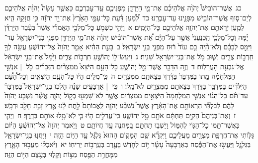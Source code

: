 \documentclass[18pt]{article}
\newcommand{\kri}[1]{\Afootnote{#1}}	%
\begin{document}
 {\loc כג~}אֲשֶׁר־הוֹבִישׁ֩ יְהֹוָ֨ה אֱלֹהֵיכֶ֜ם אֶת־מֵ֧י הַיַּרְדֵּ֛ן מִפְּנֵיכֶ֖ם עַֽד־עׇבְרְכֶ֑ם כַּאֲשֶׁ֣ר עָשָׂה֩ יְהֹוָ֨ה אֱלֹהֵיכֶ֧ם לְיַם־ס֛וּף אֲשֶׁר־הוֹבִ֥ישׁ מִפָּנֵ֖ינוּ עַד־עׇבְרֵֽנוּ׃ \startlock
 {\loc כד~}לְ֠מַ֠עַן דַּ֜עַת כׇּל־עַמֵּ֤י הָאָ֙רֶץ֙ אֶת־יַ֣ד יְהֹוָ֔ה כִּ֥י חֲזָקָ֖ה הִ֑יא לְמַ֧עַן יְרָאתֶ֛ם אֶת־יְהֹוָ֥ה אֱלֹהֵיכֶ֖ם כׇּל־הַיָּמִֽים׃ 
\startlock
 {\loc א~}וַיְהִ֣י כִשְׁמֹ֣עַ כׇּל־מַלְכֵ֣י הָאֱמֹרִ֡י אֲשֶׁר֩ בְּעֵ֨בֶר הַיַּרְדֵּ֜ן יָ֗מָּה וְכׇל־מַלְכֵ֤י הַֽכְּנַעֲנִי֙ אֲשֶׁ֣ר עַל־הַיָּ֔ם אֵ֠ת אֲשֶׁר־הוֹבִ֨ישׁ יְהֹוָ֜ה אֶת־מֵ֧י הַיַּרְדֵּ֛ן מִפְּנֵ֥י בְנֵי־יִשְׂרָאֵ֖ל עַד־ \edtext{(עברנו)}{\kri{קרי: עׇבְרָ֑ם}}  וַיִּמַּ֣ס לְבָבָ֗ם וְלֹא־הָ֨יָה בָ֥ם עוֹד֙ ר֔וּחַ מִפְּנֵ֖י בְּנֵ֥י יִשְׂרָאֵֽל׃ \startlock
 {\loc ב~}בָּעֵ֣ת הַהִ֗יא אָמַ֤ר יְהֹוָה֙ אֶל־יְהוֹשֻׁ֔עַ עֲשֵׂ֥ה לְךָ֖ חַֽרְב֣וֹת צֻרִ֑ים וְשׁ֛וּב מֹ֥ל אֶת־בְּנֵֽי־יִשְׂרָאֵ֖ל שֵׁנִֽית׃ \startlock
 {\loc ג~}וַיַּעַשׂ־ל֥וֹ יְהוֹשֻׁ֖עַ חַֽרְב֣וֹת צֻרִ֑ים וַיָּ֙מׇל֙ אֶת־בְּנֵ֣י יִשְׂרָאֵ֔ל אֶל־גִּבְעַ֖ת הָעֲרָלֽוֹת׃ \startlock
 {\loc ד~}וְזֶ֥ה הַדָּבָ֖ר אֲשֶׁר־מָ֣ל יְהוֹשֻׁ֑עַ כׇּל־הָעָ֣ם הַיֹּצֵא֩ מִמִּצְרַ֨יִם הַזְּכָרִ֜ים כֹּ֣ל  |  אַנְשֵׁ֣י הַמִּלְחָמָ֗ה מֵ֤תוּ בַמִּדְבָּר֙ בַּדֶּ֔רֶךְ בְּצֵאתָ֖ם מִמִּצְרָֽיִם׃ \startlock
 {\loc ה~}כִּֽי־מֻלִ֣ים הָי֔וּ כׇּל־הָעָ֖ם הַיֹּצְאִ֑ים וְכׇל־הָ֠עָ֠ם הַיִּלֹּדִ֨ים בַּמִּדְבָּ֥ר בַּדֶּ֛רֶךְ בְּצֵאתָ֥ם מִמִּצְרַ֖יִם לֹא־מָֽלוּ׃ \startlock
 {\loc ו~}כִּ֣י  |  אַרְבָּעִ֣ים שָׁנָ֗ה הָלְכ֣וּ בְנֵֽי־יִשְׂרָאֵל֮ בַּמִּדְבָּר֒ עַד־תֹּ֨ם כׇּל־הַגּ֜וֹי אַנְשֵׁ֤י הַמִּלְחָמָה֙ הַיֹּצְאִ֣ים מִמִּצְרַ֔יִם אֲשֶׁ֥ר לֹא־שָׁמְע֖וּ בְּק֣וֹל יְהֹוָ֑ה אֲשֶׁ֨ר נִשְׁבַּ֤ע יְהֹוָה֙ לָהֶ֔ם לְבִלְתִּ֞י הַרְאוֹתָ֣ם אֶת־הָאָ֗רֶץ אֲשֶׁר֩ נִשְׁבַּ֨ע יְהֹוָ֤ה לַֽאֲבוֹתָם֙ לָ֣תֶת לָ֔נוּ אֶ֛רֶץ זָבַ֥ת חָלָ֖ב וּדְבָֽשׁ׃ \startlock
 {\loc ז~}וְאֶת־בְּנֵיהֶם֙ הֵקִ֣ים תַּחְתָּ֔ם אֹתָ֖ם מָ֣ל יְהוֹשֻׁ֑עַ כִּֽי־עֲרֵלִ֣ים הָי֔וּ כִּ֛י לֹֽא־מָ֥לוּ אוֹתָ֖ם בַּדָּֽרֶךְ׃ \startlock
 {\loc ח~}וַיְהִ֛י כַּאֲשֶׁר־תַּ֥מּוּ כׇל־הַגּ֖וֹי לְהִמּ֑וֹל וַיֵּשְׁב֥וּ תַחְתָּ֛ם בַּֽמַּחֲנֶ֖ה עַ֥ד חֲיוֹתָֽם׃ \startlock
 {\loc ט~}וַיֹּ֤אמֶר יְהֹוָה֙ אֶל־יְהוֹשֻׁ֔עַ הַיּ֗וֹם גַּלּ֛וֹתִי אֶת־חֶרְפַּ֥ת מִצְרַ֖יִם מֵעֲלֵיכֶ֑ם וַיִּקְרָ֞א שֵׁ֣ם הַמָּק֤וֹם הַהוּא֙ גִּלְגָּ֔ל עַ֖ד הַיּ֥וֹם הַזֶּֽה׃ \startlock
 {\loc י~}וַיַּחֲנ֥וּ בְנֵֽי־יִשְׂרָאֵ֖ל בַּגִּלְגָּ֑ל וַיַּעֲשׂ֣וּ אֶת־הַפֶּ֡סַח בְּאַרְבָּעָה֩ עָשָׂ֨ר י֥וֹם לַחֹ֛דֶשׁ בָּעֶ֖רֶב בְּעַֽרְב֥וֹת יְרִיחֽוֹ׃ \startlock
 {\loc יא~}וַיֹּ֨אכְל֜וּ מֵעֲב֥וּר הָאָ֛רֶץ  מִמׇּחֳרַ֥ת  הַפֶּ֖סַח מַצּ֣וֹת וְקָל֑וּי בְּעֶ֖צֶם הַיּ֥וֹם הַזֶּֽה׃ \startlock
\end{document}
